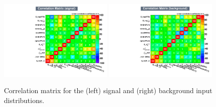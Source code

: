 \begin{figure}[h]
\centering
\includegraphics[width=0.49\textwidth]{figs/TMVA/BDTG_Data_all_all_all/CorrelationMatrixS.pdf}
\includegraphics[width=0.49\textwidth]{figs/TMVA/BDTG_Data_all_all_all/CorrelationMatrixB.pdf}
\caption{Correlation matrix for the (left) signal and (right) background input distributions.}
\label{fig:}
\end{figure}



